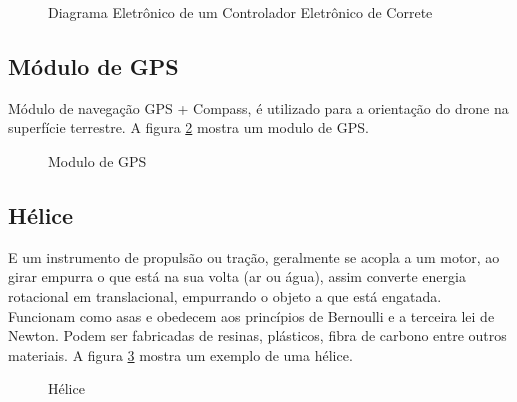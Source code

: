 \begin{figure}[H]
	\centering
	\caption{Diagrama Eletrônico de um Controlador Eletrônico de Correte}
	\def\svgwidth{15cm}
	
	\label{fig:motordrive}
\end{figure}

\subsection{Módulo de GPS}
Módulo de navegação GPS + Compass, é utilizado para a orientação do drone na superfície terrestre. A figura \ref{fig:gps} mostra um modulo de GPS.
\begin{figure}[H]
	\centering
	\caption{Modulo de GPS}
	\fontsize{9pt}{12pt}\selectfont
	\def\svgwidth{15cm}
	
	\label{fig:gps}
\end{figure}

\subsection{Hélice}
E um instrumento de propulsão ou tração, geralmente se acopla a um motor, ao girar empurra o que está na sua volta (ar ou água), assim converte energia rotacional em translacional, empurrando o objeto a que está engatada. Funcionam como asas e obedecem aos princípios de Bernoulli e a terceira lei de Newton. Podem ser fabricadas de resinas, plásticos, fibra de carbono entre outros materiais. A figura \ref{fig:helice} mostra um exemplo de uma hélice.
\begin{figure}[H]
	\centering
	\caption{Hélice}
	\fontsize{9pt}{12pt}\selectfont
	\def\svgwidth{13cm}
	
	\label{fig:helice}
\end{figure}

